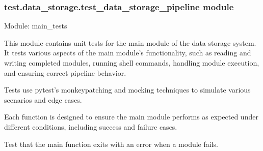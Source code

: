 \documentclass[letterpaper,10pt,english]{sphinxmanual}
\begin{document}
\subsubsection{test.data\_storage.test\_data\_storage\_pipeline module}
\label{\detokenize{test.data_storage:module-test.data_storage.test_data_storage_pipeline}}\label{\detokenize{test.data_storage:test-data-storage-test-data-storage-pipeline-module}}
\sphinxAtStartPar
Module: main\_tests

\sphinxAtStartPar
This module contains unit tests for the main module of the data storage
system. It tests various aspects of the main module’s functionality, such
as reading and writing completed modules, running shell commands, handling
module execution, and ensuring correct pipeline behavior.

\sphinxAtStartPar
Tests use pytest’s monkeypatching and mocking techniques to simulate
various scenarios and edge cases.

\sphinxAtStartPar
Each function is designed to ensure the main module performs as expected
under different conditions, including success and failure cases.

\begin{fulllineitems}
\label{\detokenize{test.data_storage:test.data_storage.test_data_storage_pipeline.test_main_pipeline_failure}}
\pysigstartsignatures
\pysiglinewithargsret
{}
{}
{}
\pysigstopsignatures
\sphinxAtStartPar
Test that the main function exits with an error when a module fails.

\end{fulllineitems}

\end{document}
